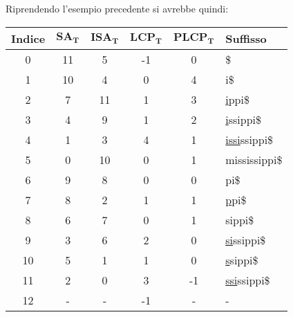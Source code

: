 \begin{esempio}
  Riprendendo l'esempio precedente si avrebbe quindi:
  \begin{table}[H]
    \centering
    \footnotesize
    \begin{tabular}{c|c|c|c|c|l} 
      \textbf{Indice} & $\mathbf{SA_T}$ & $\mathbf{ISA_T}$ & $\mathbf{LCP_T}$
      & $\mathbf{PLCP_T}$ & \textbf{Suffisso}\\  
      \hline
      0 & 11 & 5 & -1 & 0 & \$\\
      1 & 10 & 4 & 0 & 4 & i\$\\
      2 & 7 & 11 & 1 & 3 & \underline{i}ppi\$\\
      3 & 4 & 9 & 1 & 2 & \underline{i}ssippi\$\\
      4 & 1 & 3 & 4 & 1 & \underline{issi}ssippi\$\\
      5 & 0 & 10 & 0 & 1 & mississippi\$\\
      6 & 9 & 8 & 0 & 0 & pi\$\\
      7 & 8 & 2 & 1 & 1 & \underline{p}pi\$\\
      8 & 6 & 7 & 0 & 1 & sippi\$\\
      9 & 3 & 6 & 2 & 0 & \underline{si}ssippi\$\\
      10 & 5 & 1 & 1 & 0 & \underline{s}sippi\$\\
      11 & 2 & 0 & 3 & -1 & \underline{ssi}ssippi\$\\
      12 & - & - & -1 & - & - 
    \end{tabular}
  \end{table}
\end{esempio}
